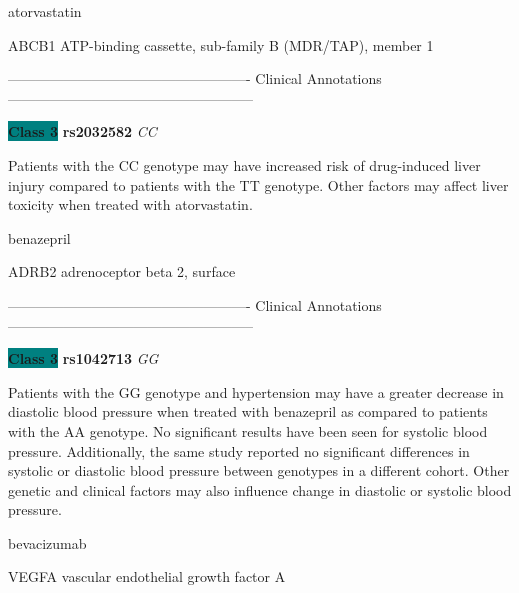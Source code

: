 \documentclass{resume} %
\begin{document}
\begin{rSection}{ atorvastatin }
\begin{rSubsection}{ ABCB1 }{ ATP-binding cassette, sub-family B (MDR/TAP), member 1 }{}{}
\item[] ---------------------------------------------------- Clinical Annotations -----------------------------------------------------\newline
\item \textbf{\colorbox{teal} {Class 3}} \textbf{ rs2032582 } \textit{ CC }
\item[] Patients with the CC genotype may have increased risk of drug-induced liver injury compared to patients with the TT genotype. Other factors may affect liver toxicity when treated with atorvastatin.
\end{rSubsection}

\end{rSection}\begin{rSection}{ benazepril }
\item[]

\begin{rSubsection}{ ADRB2 }{ adrenoceptor beta 2, surface }{}{}
\item[]

\item[] ---------------------------------------------------- Clinical Annotations -----------------------------------------------------\newline
\item \textbf{\colorbox{teal} {Class 3}} \textbf{ rs1042713 } \textit{ GG }
\item[] Patients with the GG genotype and hypertension may have a greater decrease in diastolic blood pressure when treated with benazepril as compared to patients with the AA genotype. No significant results have been seen for systolic blood pressure. Additionally, the same study reported no significant differences in systolic or diastolic blood pressure between genotypes in a different cohort. Other genetic and clinical factors may also influence change in diastolic or systolic blood pressure.
\end{rSubsection}

\end{rSection}\begin{rSection}{ bevacizumab }
\item[]

\begin{rSubsection}{ VEGFA }{ vascular endothelial growth factor A }{}{}
\item[]


\end{rSubsection}
\end{rSection}
\end{document}

